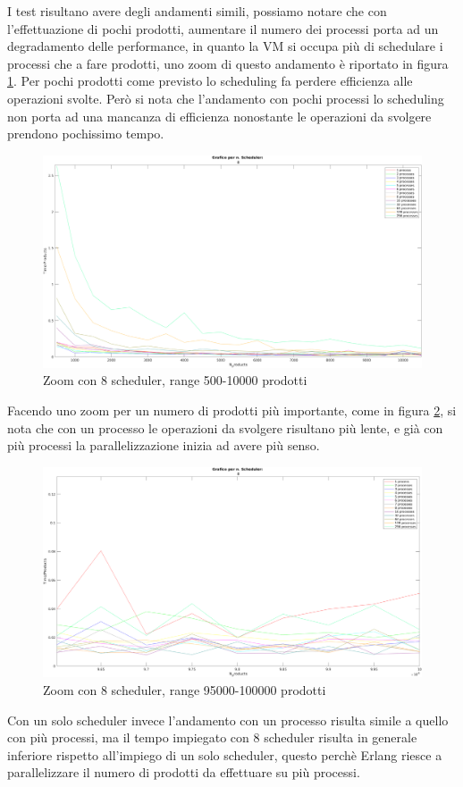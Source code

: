 I test risultano avere degli andamenti simili, possiamo notare che
con l'effettuazione di pochi prodotti, aumentare il numero dei processi
porta ad un degradamento delle performance, in quanto la VM si occupa più
di schedulare i processi che a fare prodotti, uno zoom di questo
andamento è riportato in figura \ref{fig:zoom_8_inizio}.
Per pochi prodotti come previsto lo scheduling fa perdere efficienza
alle operazioni svolte.
Però si nota che l'andamento con pochi processi lo scheduling non porta
ad una mancanza di efficienza nonostante le operazioni da svolgere prendono
pochissimo tempo.
\begin{figure}[!htp]
    \centering
    \includegraphics[keepaspectratio=true,scale=0.335]{images/matlab/zoom_8_inizio.png}
	\caption{Zoom con 8 scheduler, range 500-10000 prodotti}
  	\label{fig:zoom_8_inizio}
\end{figure}

Facendo uno zoom per un numero di prodotti più importante, come in
figura \ref{fig:zoom_8_fine}, si nota che con un processo le operazioni
da svolgere risultano più lente, e già con più processi la parallelizzazione
inizia ad avere più senso.

\begin{figure}[!htp]
    \centering
    \includegraphics[keepaspectratio=true,scale=0.33]{images/matlab/zoom_8_fine.png}
	\caption{Zoom con 8 scheduler, range 95000-100000 prodotti}
  	\label{fig:zoom_8_fine}
\end{figure}

Con un solo scheduler invece l'andamento con un processo risulta simile
a quello con più processi, ma il tempo impiegato con 8 scheduler risulta
in generale inferiore rispetto all'impiego di un solo scheduler, questo
perchè Erlang riesce a parallelizzare il numero di prodotti da effettuare
su più processi.

	